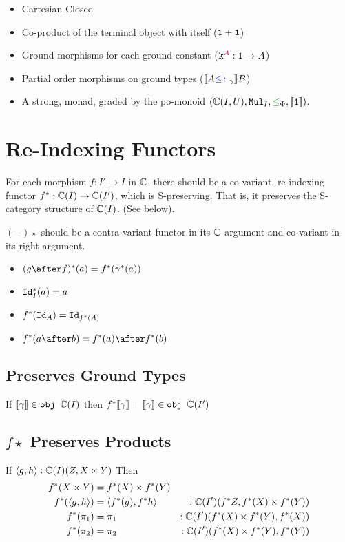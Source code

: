 \documentclass{report}
\begin{document}
\begin{itemize}
    \item Cartesian Closed
    \item Co-product of the terminal object with itself ($\texttt{1} + \texttt{1}$)
    \item Ground morphisms for each ground constant ($\texttt{k}^{\color{purple} A}: \texttt{1}\rightarrow A$)
    \item Partial order morphisms on ground types (${\bf [\![}A{\color{blue} \leq\colon}_\gamma{\bf ]\!]} B$)
    \item A strong, monad, graded by the po-monoid $(\ciu, \Mul_I, \subeffectp, \deno{\1})$.
\end{itemize}


\section{Re-Indexing Functors}
For each morphism $f: I' \rightarrow I$ in $\mathbb{C}$, there should be a co-variant, re-indexing functor  $f^*: \mathbb{C}(I) \rightarrow \mathbb{C}(I')$, which is S-preserving. That is, it preserves the S-category structure of $\mathbb{C}(I)$. (See below).

$(-)\star$ should be a contra-variant functor in its $\mathbb{C}$ argument and co-variant in its right argument.

\begin{itemize}
    \item $(g\after f)\star(a) = f\star(\g\star(a))$
    \item $\texttt{Id}_{I}^*(a) = a$
    \item $f^*(\texttt{Id}_{A}) = \texttt{Id}_{f^*(A)}$
    \item $f\star(a\after b) = f\star(a)\after f\star(b)$
\end{itemize}
\subsection{Preserves Ground Types}
If ${\bf [\![}\gamma{\bf ]\!]}\in\texttt{obj }\mathbb{C}(I)$ then $f^*{\bf [\![}\gamma{\bf ]\!]} = {\bf [\![}\gamma{\bf ]\!]}\in\texttt{obj }\mathbb{C}(I')$
\subsection{$f\star$ Preserves Products}
If $\langle g, h\rangle:\mathbb{C}(I)(Z, X\times Y)$
Then 
\begin{align*}
    f^*(X\times Y) & = f^*(X)\times f^*(Y)\\
    f^*(\langle g, h\rangle) & = \langle f^*(g), f^*{h}\rangle&:\mathbb{C}(I')(f^* Z, f^*(X)\times f^*(Y))\\
    f^*(\pi_1) & = \pi_1&:\mathbb{C}(I')(f^*(X)\times f^*(Y), f^*(X)) \\
    f^*(\pi_2) &= \pi_2&:\mathbb{C}(I')(f^*(X)\times f^*(Y), f^*(Y))
\end{align*}
\end{document}

